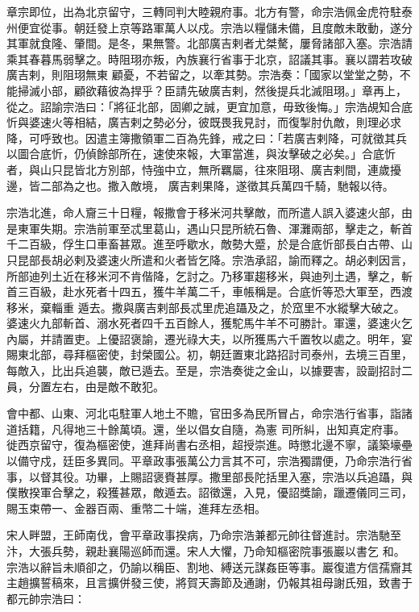 \begin{pinyinscope}
 章宗即位，出為北京留守，三轉同判大睦親府事。北方有警，命宗浩佩金虎符駐泰州便宜從事。朝廷發上京等路軍萬人以戍。宗浩以糧儲未備，且度敵未敢動，遂分其軍就食隆、肇間。是冬，果無警。北部廣吉剌者尤桀驁，屢脅諸部入塞。宗浩請乘其春暮馬弱擊之。時阻珝亦叛，內族襄行省事于北京，詔議其事。襄以謂若攻破廣吉剌，則阻珝無東
 顧憂，不若留之，以牽其勢。宗浩奏：「國家以堂堂之勢，不能掃滅小部，顧欲藉彼為捍乎？臣請先破廣吉剌，然後提兵北滅阻珝。」章再上，從之。詔諭宗浩曰：「將征北部，固卿之誠，更宜加意，毋致後悔。」宗浩覘知合底忻與婆速火等相結，廣吉剌之勢必分，彼既畏我見討，而復掣肘仇敵，則理必求降，可呼致也。因遣主簿撒領軍二百為先鋒，戒之曰：「若廣吉剌降，可就徵其兵以圖合底忻，仍偵餘部所在，速使來報，大軍當進，與汝擊破之必矣。」合底忻者，與山只昆皆北方別部，恃強中立，無所羈屬，往來阻珝、廣吉剌間，連歲擾邊，皆二部為之也。撒入敵境，
 廣吉剌果降，遂徵其兵萬四千騎，馳報以待。



 宗浩北進，命人齎三十日糧，報撒會于移米河共擊敵，而所遣人誤入婆速火部，由是東軍失期。宗浩前軍至忒里葛山，遇山只昆所統石魯、渾灘兩部，擊走之，斬首千二百級，俘生口車畜甚眾。進至呼歇水，敵勢大蹙，於是合底忻部長白古帶、山只昆部長胡必剌及婆速火所遣和火者皆乞降。宗浩承詔，諭而釋之。胡必剌因言，所部迪列土近在移米河不肯偕降，乞討之。乃移軍趨移米，與迪列土遇，擊之，斬首三百級，赴水死者十四五，獲牛羊萬二千，車帳稱是。合底忻等恐大軍至，西渡移米，棄輜重
 遁去。撒與廣吉剌部長忒里虎追躡及之，於窊里不水縱擊大破之。婆速火九部斬首、溺水死者四千五百餘人，獲駝馬牛羊不可勝計。軍還，婆速火乞內屬，并請置吏。上優詔褒諭，遷光祿大夫，以所獲馬六千置牧以處之。明年，宴賜東北部，尋拜樞密使，封榮國公。初，朝廷置東北路招討司泰州，去境三百里，每敵入，比出兵追襲，敵已遁去。至是，宗浩奏徙之金山，以據要害，設副招討二員，分置左右，由是敵不敢犯。



 會中都、山東、河北屯駐軍人地土不贍，官田多為民所冒占，命宗浩行省事，詣諸道括籍，凡得地三十餘萬頃。還，坐以倡女自隨，為憲
 司所糾，出知真定府事。徙西京留守，復為樞密使，進拜尚書右丞相，超授崇進。時懲北邊不寧，議築壕壘以備守戍，廷臣多異同。平章政事張萬公力言其不可，宗浩獨謂便，乃命宗浩行省事，以督其役。功畢，上賜詔褒賚甚厚。撒里部長陀括里入塞，宗浩以兵追躡，與僕散揆軍合擊之，殺獲甚眾，敵遁去。詔徵還，入見，優詔獎諭，躐遷儀同三司，賜玉束帶一、金器百兩、重幣二十端，進拜左丞相。



 宋人畔盟，王師南伐，會平章政事揆病，乃命宗浩兼都元帥往督進討。宗浩馳至汴，大張兵勢，親赴襄陽巡師而還。宋人大懼，乃命知樞密院事張巖以書乞
 和。宗浩以辭旨未順卻之，仍諭以稱臣、割地、縛送元謀姦臣等事。巖復遣方信孺齎其主趙擴誓稿來，且言擴併發三使，將賀天壽節及通謝，仍報其祖母謝氏殂，致書于都元帥宗浩曰：




\end{pinyinscope}
